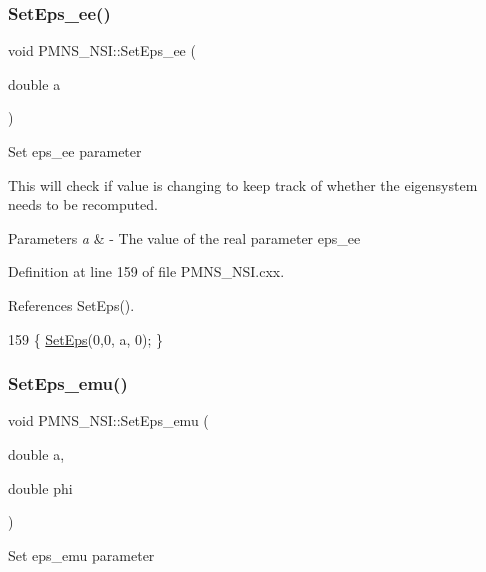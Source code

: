 \subsubsection{\texorpdfstring{Set\+Eps\+\_\+ee()}{SetEps\_ee()}}
{\footnotesize\ttfamily void P\+M\+N\+S\+\_\+\+N\+S\+I\+::\+Set\+Eps\+\_\+ee (\begin{DoxyParamCaption}\item[{double}]{a }\end{DoxyParamCaption})\hspace{0.3cm}{\ttfamily [virtual]}}

Set eps\+\_\+ee parameter

This will check if value is changing to keep track of whether the eigensystem needs to be recomputed.


\begin{DoxyParams}{Parameters}
{\em a} & -\/ The value of the real parameter eps\+\_\+ee \\
\hline
\end{DoxyParams}


Definition at line 159 of file P\+M\+N\+S\+\_\+\+N\+S\+I.\+cxx.



References Set\+Eps().


\begin{DoxyCode}
159 \{ \hyperlink{classOscProb_1_1PMNS__NSI_a87c508149ea36b6de493a6817247a0ea}{SetEps}(0,0, a, 0); \}
\end{DoxyCode}
\mbox{\label{classOscProb_1_1PMNS__NSI_ad5fccd151aea7c673c516b8686f8253c}} 
\subsubsection{\texorpdfstring{Set\+Eps\+\_\+emu()}{SetEps\_emu()}}
{\footnotesize\ttfamily void P\+M\+N\+S\+\_\+\+N\+S\+I\+::\+Set\+Eps\+\_\+emu (\begin{DoxyParamCaption}\item[{double}]{a,  }\item[{double}]{phi }\end{DoxyParamCaption})\hspace{0.3cm}{\ttfamily [virtual]}}

Set eps\+\_\+emu parameter

